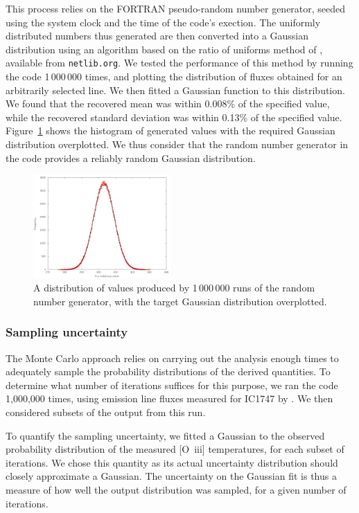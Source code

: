 \documentclass[useAMS,usenatbib]{mn2e}
\begin{document}
This process relies on the FORTRAN pseudo-random number generator, seeded using the system clock and the time of the code's exection.  The uniformly distributed numbers thus generated are then converted into a Gaussian distribution using an algorithm based on the ratio of uniforms method of \citet{Kinderman:1977:CGR:355744.355750}, available from \texttt{netlib.org}.  We tested the performance of this method by running the code 1\,000\,000 times, and plotting the distribution of fluxes obtained for an arbitrarily selected line.  We then fitted a Gaussian function to this distribution.  We found that the recovered mean was within 0.008\% of the specified value, while the recovered standard deviation was within 0.13\% of the specified value.  Figure~\ref{gaussiantest} shows the histogram of generated values with the required Gaussian distribution overplotted.  We thus consider that the random number generator in the code provides a reliably random Gaussian distribution.

\begin{figure}
\includegraphics[width=0.47\textwidth]{figures/gaussian_test.png}
\caption{A distribution of values produced by 1\,000\,000 runs of the random number generator, with the target Gaussian distribution overplotted.}
\label{gaussiantest}
\end{figure}

\subsubsection{Sampling uncertainty}

The Monte Carlo approach relies on carrying out the analysis enough times to adequately sample the probability distributions of the derived quantities.  To determine what number of iterations suffices for this purpose, we ran the code 1,000,000 times, using emission line fluxes measured for IC1747 by \citet{2005MNRAS.362..424W}.  We then considered subsets of the output from this run.

To quantify the sampling uncertainty, we fitted a Gaussian to the observed probability distribution of the measured [O~{\sc iii}] temperatures, for each subset of iterations.  We chose this quantity as its actual uncertainty distribution should closely approximate a Gaussian.  The uncertainty on the Gaussian fit is thus a measure of how well the output distribution was sampled, for a given number of iterations.
\end{document}
